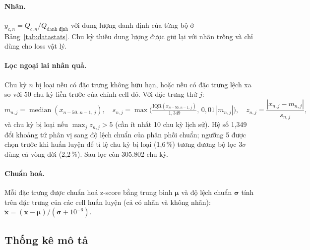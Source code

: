 \documentclass[12pt,a4paper,oneside]{report}
\theoremstyle{plain}
\theoremstyle{definition}
\begin{document}
\paragraph{Nhãn.} $y_{c,n} = Q_{c,n}/Q_\text{danh định}$ với dung lượng danh định của từng bộ ở
Bảng~\ref{tab:datastats}. Chu kỳ thiếu dung lượng được giữ lại với nhãn trống và chỉ dùng cho loss vật lý.

\paragraph{Lọc ngoại lai nhân quả.} Chu kỳ $n$ bị loại nếu có đặc trưng không hữu hạn, hoặc nếu có đặc trưng
lệch xa so với 50 chu kỳ liền trước của chính cell đó. Với đặc trưng thứ $j$:
\begin{equation}
m_{n,j} = \operatorname{median}(x_{n-50..n-1,\,j}), \quad
s_{n,j} = \max\!\Big(\tfrac{\mathrm{IQR}(x_{n-50..n-1,\,j})}{1{,}349},\, 0{,}01\,|m_{n,j}|\Big), \quad
z_{n,j} = \frac{|x_{n,j} - m_{n,j}|}{s_{n,j}},
\end{equation}
và chu kỳ bị loại nếu $\max_j z_{n,j} > 5$ (cần ít nhất 10 chu kỳ lịch sử). Hệ số 1,349 đổi khoảng tứ phân vị
sang độ lệch chuẩn của phân phối chuẩn; ngưỡng 5 được chọn trước khi huấn luyện để tỉ lệ chu kỳ bị loại
(1,6\,\%) tương đương bộ lọc $3\sigma$ dùng cả vòng đời (2,2\,\%). Sau lọc còn 305.802 chu kỳ.

\paragraph{Chuẩn hoá.} Mỗi đặc trưng được chuẩn hoá z-score bằng trung bình $\boldsymbol\mu$ và độ lệch chuẩn
$\boldsymbol\sigma$ tính trên đặc trưng của các cell huấn luyện (cả có nhãn và không nhãn):
$\tilde{\mathbf{x}} = (\mathbf{x} - \boldsymbol\mu)/(\boldsymbol\sigma + 10^{-6})$.

\subsection{Thống kê mô tả}
\end{document}
